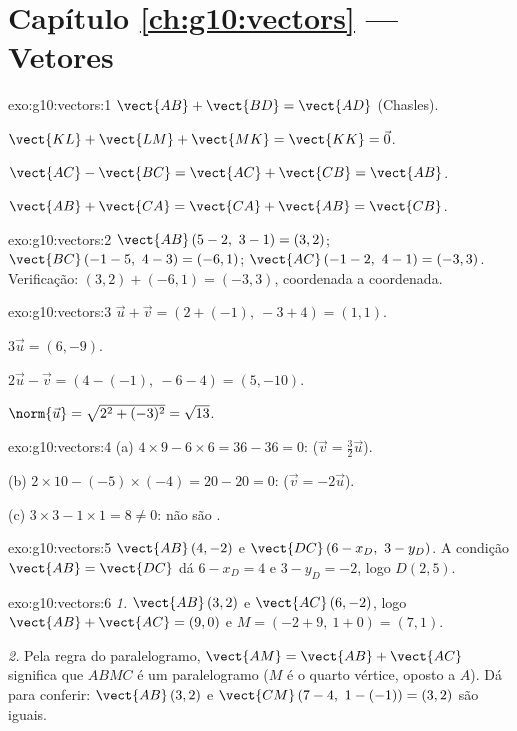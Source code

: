 \section*{Capítulo \ref{ch:g10:vectors} --- Vetores}

\begin{solution}{exo:g10:vectors:1}
$\vect{AB} + \vect{BD} = \vect{AD}$ (Chasles).

$\vect{KL} + \vect{LM} + \vect{MK} = \vect{KK} = \vec 0$.

$\vect{AC} - \vect{BC} = \vect{AC} + \vect{CB} = \vect{AB}$.

$\vect{AB} + \vect{CA} = \vect{CA} + \vect{AB} = \vect{CB}$.
\end{solution}

\begin{solution}{exo:g10:vectors:2}
$\vect{AB}\,(5-2,\ 3-1) = (3, 2)$; \quad
$\vect{BC}\,(-1-5,\ 4-3) = (-6, 1)$; \quad
$\vect{AC}\,(-1-2,\ 4-1) = (-3, 3)$.
Verificação: $(3, 2) + (-6, 1) = (-3, 3)$, coordenada a coordenada.
\end{solution}

\begin{solution}{exo:g10:vectors:3}
$\vec u + \vec v = (2 + (-1),\ -3 + 4) = (1, 1)$.

$3\vec u = (6, -9)$.

$2\vec u - \vec v = (4 - (-1),\ -6 - 4) = (5, -10)$.

$\norm{\vec u} = \sqrt{2^2 + (-3)^2} = \sqrt{13}$.
\end{solution}

\begin{solution}{exo:g10:vectors:4}
(a) $4 \times 9 - 6 \times 6 = 36 - 36 = 0$: 
($\vec v = \frac32 \vec u$).

(b) $2 \times 10 - (-5) \times (-4) = 20 - 20 = 0$: 
($\vec v = -2\vec u$).

(c) $3 \times 3 - 1 \times 1 = 8 \neq 0$: não são .
\end{solution}

\begin{solution}{exo:g10:vectors:5}
$\vect{AB}\,(4, -2)$ e $\vect{DC}\,(6 - x_D,\ 3 - y_D)$. A condição
$\vect{AB} = \vect{DC}$ dá $6 - x_D = 4$ e $3 - y_D = -2$, logo
$D(2, 5)$.
\end{solution}

\begin{solution}{exo:g10:vectors:6}
\emph{1.} $\vect{AB}\,(3, 2)$ e $\vect{AC}\,(6, -2)$, logo
$\vect{AB} + \vect{AC} = (9, 0)$ e
$M = (-2 + 9,\ 1 + 0) = (7, 1)$.

\emph{2.} Pela regra do paralelogramo, $\vect{AM} = \vect{AB} +
\vect{AC}$ significa que $ABMC$ é um paralelogramo ($M$ é o quarto
vértice, oposto a $A$). Dá para conferir: $\vect{AB}\,(3,2)$ e
$\vect{CM}\,(7-4,\ 1-(-1)) = (3, 2)$ são iguais.
\end{solution}

